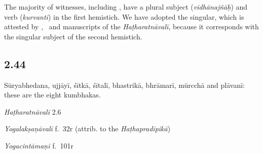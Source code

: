 \begin{ekdosis}
\begin{testimonia}[hp02_043]
\begin{versinnote}
\end{versinnote}
\end{testimonia}

\begin{philcomm}[hp02_043]
The majority of witnesses, including \alphaTwo, have a plural subject (\emph{vidhānajñāḥ}) and verb (\emph{kurvanti}) in the first hemistich. We have adopted the singular, which is attested by \alphaOne, \alphaThree\ and manuscripts of the \emph{Haṭharatnāvalī}, because it corresponds with the singular subject of the second hemistich. 
\end{philcomm}

\subsection*{2.44}
\begin{translation}[hp02_044]
Sūryabhedana, ujjāyī, śītkā, śītalī, bhastrikā, bhrāmarī, mūrcchā and plāvanī: these are the eight kumbhakas.
\end{translation}

\begin{sources}[hp02_044]
\end{sources}

\begin{testimonia}[hp02_044]

\emph{Haṭharatnāvalī} 2.6
\begin{versinnote}
\end{versinnote}

\emph{Yogalakṣaṇāvalī} f.~32r (attrib. to the \emph{Haṭhapradīpikā})
\begin{versinnote}
\end{versinnote}

\emph{Yogacintāmaṇi} f.~101r

\begin{versinnote}
\end{versinnote}


\end{testimonia}
\end{ekdosis}
